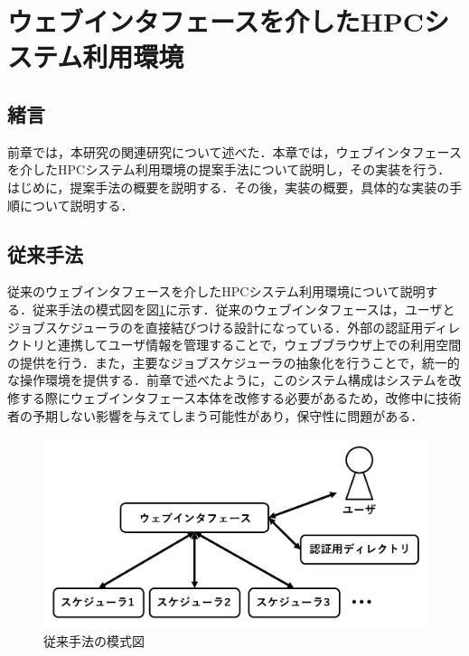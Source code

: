 
\section{ウェブインタフェースを介したHPCシステム利用環境}

\subsection{緒言}
前章では，本研究の関連研究について述べた．本章では，ウェブインタフェースを介したHPCシステム利用環境の提案手法について説明し，その実装を行う．はじめに，提案手法の概要を説明する．その後，実装の概要，具体的な実装の手順について説明する．\par

\subsection{従来手法}
従来のウェブインタフェースを介したHPCシステム利用環境について説明する．従来手法の模式図を図\ref{fig5}に示す．従来のウェブインタフェースは，ユーザとジョブスケジューラのを直接結びつける設計になっている．外部の認証用ディレクトリと連携してユーザ情報を管理することで，ウェブブラウザ上での利用空間の提供を行う．また，主要なジョブスケジューラの抽象化を行うことで，統一的な操作環境を提供する．前章で述べたように，このシステム構成はシステムを改修する際にウェブインタフェース本体を改修する必要があるため，改修中に技術者の予期しない影響を与えてしまう可能性があり，保守性に問題がある．\par

\begin{figure}[b]
    \centering
    \includegraphics[width=120mm]{./fig/conventional_method.png}
    \caption{従来手法の模式図}
    \label{fig5}
\end{figure}

